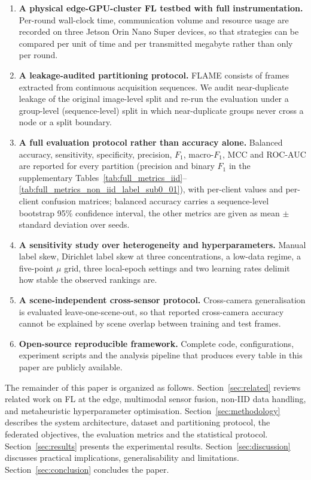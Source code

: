 \documentclass[journal]{IEEEtran}
\begin{document}
\begin{enumerate}
    \item \textbf{A physical edge-GPU-cluster FL testbed with full instrumentation.} Per-round wall-clock time, communication volume and resource usage are recorded on three Jetson Orin Nano Super devices, so that strategies can be compared per unit of time and per transmitted megabyte rather than only per round.

    \item \textbf{A leakage-audited partitioning protocol.} FLAME consists of frames extracted from continuous acquisition sequences. We audit near-duplicate leakage of the original image-level split and re-run the evaluation under a group-level (sequence-level) split in which near-duplicate groups never cross a node or a split boundary.

    \item \textbf{A full evaluation protocol rather than accuracy alone.} Balanced accuracy, sensitivity, specificity, precision, $F_1$, macro-$F_1$, MCC and ROC-AUC are reported for every partition (precision and binary $F_1$ in the supplementary Tables~\ref{tab:full_metrics_iid}--\ref{tab:full_metrics_non_iid_label_sub0_01}), with per-client values and per-client confusion matrices; balanced accuracy carries a sequence-level bootstrap 95\% confidence interval, the other metrics are given as mean $\pm$ standard deviation over seeds.

    \item \textbf{A sensitivity study over heterogeneity and hyperparameters.} Manual label skew, Dirichlet label skew at three concentrations, a low-data regime, a five-point $\mu$ grid, three local-epoch settings and two learning rates delimit how stable the observed rankings are.

    \item \textbf{A scene-independent cross-sensor protocol.} Cross-camera generalisation is evaluated leave-one-scene-out, so that reported cross-camera accuracy cannot be explained by scene overlap between training and test frames.

    \item \textbf{Open-source reproducible framework.} Complete code, configurations, experiment scripts and the analysis pipeline that produces every table in this paper are publicly available.
\end{enumerate}

The remainder of this paper is organized as follows. Section~\ref{sec:related} reviews related work on FL at the edge, multimodal sensor fusion, non-IID data handling, and metaheuristic hyperparameter optimisation. Section~\ref{sec:methodology} describes the system architecture, dataset and partitioning protocol, the federated objectives, the evaluation metrics and the statistical protocol. Section~\ref{sec:results} presents the experimental results. Section~\ref{sec:discussion} discusses practical implications, generalisability and limitations. Section~\ref{sec:conclusion} concludes the paper.
\end{document}
